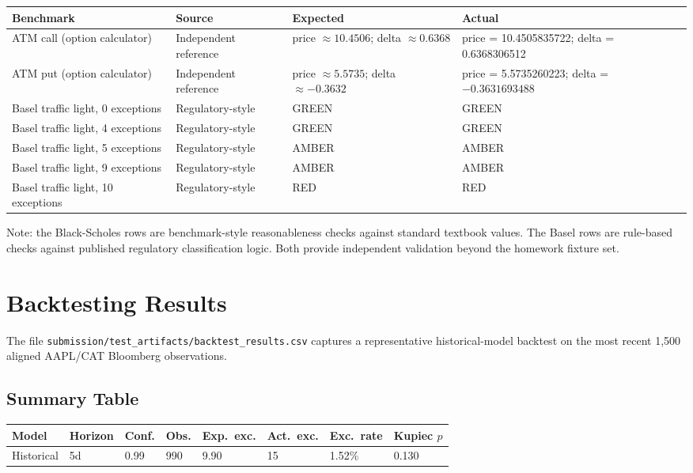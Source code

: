 \documentclass[11pt]{article}
\newcommand{\code}[1]{\texttt{#1}}
\begin{document}
\begin{center}
\begin{tabular}{L{3.5cm}L{2.5cm}L{3.5cm}L{3.5cm}}
\toprule
\textbf{Benchmark} & \textbf{Source} & \textbf{Expected} & \textbf{Actual} \\
\midrule
ATM call (option calculator) & Independent reference & price $\approx 10.4506$; delta $\approx 0.6368$ & price = 10.4505835722; delta = 0.6368306512 \\
ATM put (option calculator) & Independent reference & price $\approx 5.5735$; delta $\approx -0.3632$ & price = 5.5735260223; delta = $-0.3631693488$ \\
Basel traffic light, 0 exceptions & Regulatory-style & GREEN & GREEN \\
Basel traffic light, 4 exceptions & Regulatory-style & GREEN & GREEN \\
Basel traffic light, 5 exceptions & Regulatory-style & AMBER & AMBER \\
Basel traffic light, 9 exceptions & Regulatory-style & AMBER & AMBER \\
Basel traffic light, 10 exceptions & Regulatory-style & RED & RED \\
\bottomrule
\end{tabular}
\end{center}

Note: the Black-Scholes rows are benchmark-style reasonableness checks
against standard textbook values.  The Basel rows are rule-based checks
against published regulatory classification logic.  Both provide
independent validation beyond the homework fixture set.

\section{Backtesting Results}

The file \code{submission/test\_artifacts/backtest\_results.csv} captures
a representative historical-model backtest on the most recent 1,500
aligned AAPL/CAT Bloomberg observations.

\subsection{Summary Table}

\begin{center}
\small
\begin{tabular}{L{2.2cm}L{1.5cm}L{1.3cm}L{1.2cm}L{1.5cm}L{1.5cm}L{1.5cm}L{1.5cm}}
\toprule
\textbf{Model} & \textbf{Horizon} & \textbf{Conf.} & \textbf{Obs.} & \textbf{Exp.\ exc.} & \textbf{Act.\ exc.} & \textbf{Exc.\ rate} & \textbf{Kupiec $p$} \\
\midrule
Historical & 5d & 0.99 & 990 & 9.90 & 15 & 1.52\% & 0.130 \\
\bottomrule
\end{tabular}
\end{center}
\end{document}

